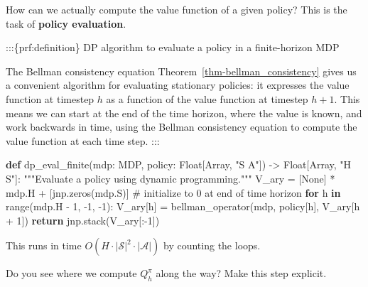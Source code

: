 \documentclass[
  letterpaper,
  DIV=11,
  numbers=noendperiod]{scrreprt}
\newenvironment{Shaded}{\begin{snugshade}}{\end{snugshade}}
\newcommand{\BuiltInTok}[1]{\textcolor[rgb]{0.00,0.23,0.31}{#1}}
\newcommand{\CommentTok}[1]{\textcolor[rgb]{0.37,0.37,0.37}{#1}}
\newcommand{\ControlFlowTok}[1]{\textcolor[rgb]{0.00,0.23,0.31}{\textbf{#1}}}
\newcommand{\DecValTok}[1]{\textcolor[rgb]{0.68,0.00,0.00}{#1}}
\newcommand{\KeywordTok}[1]{\textcolor[rgb]{0.00,0.23,0.31}{\textbf{#1}}}
\newcommand{\NormalTok}[1]{\textcolor[rgb]{0.00,0.23,0.31}{#1}}
\newcommand{\OperatorTok}[1]{\textcolor[rgb]{0.37,0.37,0.37}{#1}}
\newcommand{\StringTok}[1]{\textcolor[rgb]{0.13,0.47,0.30}{#1}}
\newcommand{\VariableTok}[1]{\textcolor[rgb]{0.07,0.07,0.07}{#1}}
\theoremstyle{plain}
\theoremstyle{plain}
\theoremstyle{definition}
\theoremstyle{definition}
\theoremstyle{remark}
\begin{document}
How can we actually compute the value function of a given policy? This
is the task of \textbf{policy evaluation}.

:::\{prf:definition\} DP algorithm to evaluate a policy in a
finite-horizon MDP

The Bellman consistency equation Theorem~\ref{thm-bellman_consistency}
gives us a convenient algorithm for evaluating stationary policies: it
expresses the value function at timestep \(h\) as a function of the
value function at timestep \(h+1\). This means we can start at the end
of the time horizon, where the value is known, and work backwards in
time, using the Bellman consistency equation to compute the value
function at each time step. :::

\begin{Shaded}
\begin{Highlighting}[]
\KeywordTok{def}\NormalTok{ dp\_eval\_finite(mdp: MDP, policy: Float[Array, }\StringTok{"S A"}\NormalTok{]) }\OperatorTok{{-}\textgreater{}}\NormalTok{ Float[Array, }\StringTok{"H S"}\NormalTok{]:}
    \CommentTok{"""Evaluate a policy using dynamic programming."""}
\NormalTok{    V\_ary }\OperatorTok{=}\NormalTok{ [}\VariableTok{None}\NormalTok{] }\OperatorTok{*}\NormalTok{ mdp.H }\OperatorTok{+}\NormalTok{ [jnp.zeros(mdp.S)]  }\CommentTok{\# initialize to 0 at end of time horizon}
    \ControlFlowTok{for}\NormalTok{ h }\KeywordTok{in} \BuiltInTok{range}\NormalTok{(mdp.H }\OperatorTok{{-}} \DecValTok{1}\NormalTok{, }\OperatorTok{{-}}\DecValTok{1}\NormalTok{, }\OperatorTok{{-}}\DecValTok{1}\NormalTok{):}
\NormalTok{        V\_ary[h] }\OperatorTok{=}\NormalTok{ bellman\_operator(mdp, policy[h], V\_ary[h }\OperatorTok{+} \DecValTok{1}\NormalTok{])}
    \ControlFlowTok{return}\NormalTok{ jnp.stack(V\_ary[:}\OperatorTok{{-}}\DecValTok{1}\NormalTok{])}
\end{Highlighting}
\end{Shaded}

This runs in time \(O(H \cdot |\mathcal{S}|^2 \cdot |\mathcal{A}|)\) by
counting the loops.

Do you see where we compute \(Q^\pi_h\) along the way? Make this step
explicit.
\end{document}
